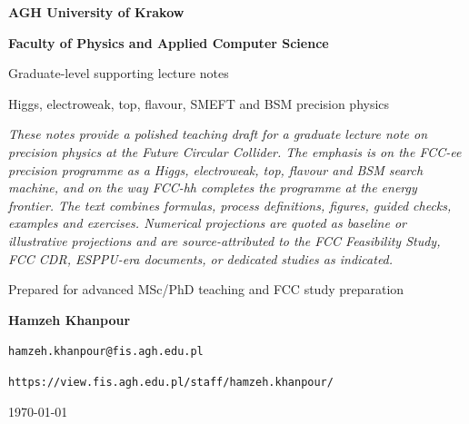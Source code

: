 \documentclass[11pt,a4paper]{article}
\numberwithin{equation}{section}
\begin{document}
\begin{titlepage}
\centering
\vspace*{1.2cm}
{\textbf{AGH University of Krakow}\par}
{\textbf{Faculty of Physics and Applied Computer Science}\par}
\vspace{1.4cm}


\vspace{1.3cm}
{\Large Graduate-level supporting lecture notes\par}
\vspace{0.35cm}
{\large Higgs, electroweak, top, flavour, SMEFT and BSM precision physics\par}
\vspace{1.2cm}



\begin{guidelinebox}
\vspace{0.25cm}
\itshape
These notes provide a polished teaching draft for a graduate lecture note on precision physics at the Future Circular Collider. The emphasis is on the FCC-ee precision programme as a Higgs, electroweak, top, flavour and BSM search machine, and on the way FCC-hh completes the programme at the energy frontier. The text combines formulas, process definitions, figures, guided checks, examples and exercises. Numerical projections are quoted as baseline or illustrative projections and are source-attributed to the FCC Feasibility Study, FCC CDR, ESPPU-era documents, or dedicated studies as indicated.
\end{guidelinebox}


\vfill

{\normalsize Prepared for advanced MSc/PhD teaching and FCC study preparation\par}
{\textbf{Hamzeh Khanpour}\par}
{\normalsize \texttt{hamzeh.khanpour@fis.agh.edu.pl}\par}
{\texttt{https://view.fis.agh.edu.pl/staff/hamzeh.khanpour/}\par}
{\normalsize \today\par}
\end{titlepage}
\end{document}
